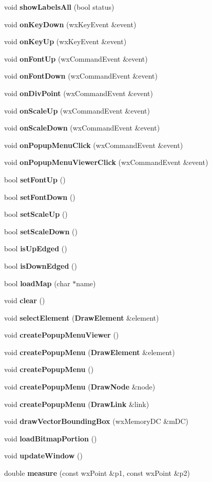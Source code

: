 \begin{DoxyCompactItemize}
\item 
void {\bf show\+Labels\+All} (bool status)
\item 
void {\bf on\+Key\+Down} (wx\+Key\+Event \&event)
\item 
void {\bf on\+Key\+Up} (wx\+Key\+Event \&event)
\item 
void {\bf on\+Font\+Up} (wx\+Command\+Event \&event)
\item 
void {\bf on\+Font\+Down} (wx\+Command\+Event \&event)
\item 
void {\bf on\+Div\+Point} (wx\+Command\+Event \&event)
\item 
void {\bf on\+Scale\+Up} (wx\+Command\+Event \&event)
\item 
void {\bf on\+Scale\+Down} (wx\+Command\+Event \&event)
\item 
void {\bf on\+Popup\+Menu\+Click} (wx\+Command\+Event \&event)
\item 
void {\bf on\+Popup\+Menu\+Viewer\+Click} (wx\+Command\+Event \&event)
\item 
bool {\bf set\+Font\+Up} ()
\item 
bool {\bf set\+Font\+Down} ()
\item 
bool {\bf set\+Scale\+Up} ()
\item 
bool {\bf set\+Scale\+Down} ()
\item 
bool {\bf is\+Up\+Edged} ()
\item 
bool {\bf is\+Down\+Edged} ()
\item 
bool {\bf load\+Map} (char $\ast$name)
\item 
void {\bf clear} ()
\item 
void {\bf select\+Element} ({\bf Draw\+Element} \&element)
\item 
void {\bf create\+Popup\+Menu\+Viewer} ()
\item 
void {\bf create\+Popup\+Menu} ({\bf Draw\+Element} \&element)
\item 
void {\bf create\+Popup\+Menu} ()
\item 
void {\bf create\+Popup\+Menu} ({\bf Draw\+Node} \&node)
\item 
void {\bf create\+Popup\+Menu} ({\bf Draw\+Link} \&link)
\item 
void {\bf draw\+Vector\+Bounding\+Box} (wx\+Memory\+DC \&m\+DC)
\item 
void {\bf load\+Bitmap\+Portion} ()
\item 
void {\bf update\+Window} ()
\item 
double {\bf measure} (const wx\+Point \&p1, const wx\+Point \&p2)

\end{DoxyCompactItemize}
